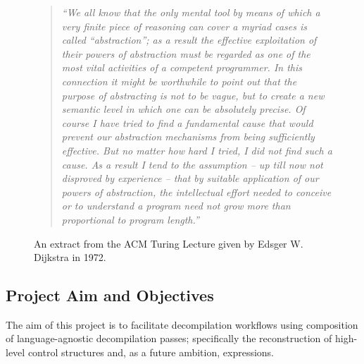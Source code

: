 \begin{figure}[htbp]
	\begin{quote}
		\textit{``We all know that the only mental tool by means of which a very finite piece of reasoning can cover a myriad cases is called ``abstraction''; as a result the effective exploitation of their powers of abstraction must be regarded as one of the most vital activities of a competent programmer. In this connection it might be worthwhile to point out that the purpose of abstracting is not to be vague, but to create a new semantic level in which one can be absolutely precise. Of course I have tried to find a fundamental cause that would prevent our abstraction mechanisms from being sufficiently effective. But no matter how hard I tried, I did not find such a cause. As a result I tend to the assumption -- up till now not disproved by experience -- that by suitable application of our powers of abstraction, the intellectual effort needed to conceive or to understand a program need not grow more than proportional to program length.''} \cite{abstractions_quote}
	\end{quote}
	\caption{An extract from the ACM Turing Lecture given by Edsger W. Dijkstra in 1972.}
	\label{fig:dijkstra_lecture}
\end{figure}

\pagebreak %


\subsection{Project Aim and Objectives}

The aim of this project is to facilitate decompilation workflows using composition of language-agnostic decompilation passes; specifically the reconstruction of high-level control structures and, as a future ambition, expressions.

